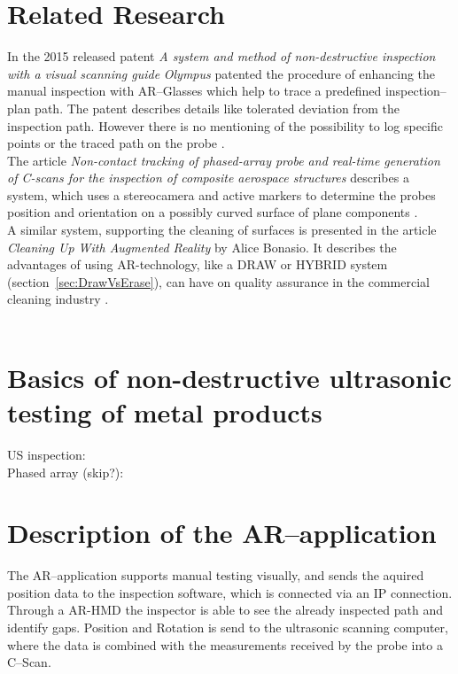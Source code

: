 \documentclass{VRARWorkshop}
\begin{document}
\section{Related Research}
In the 2015 released patent \textit{A system and method of non-destructive inspection with a visual scanning guide} \textit{Olympus} patented the procedure of enhancing the manual inspection with AR--Glasses which help to trace a predefined inspection--plan path.
The patent describes details like tolerated deviation from the inspection path.
However there is no mentioning of the possibility to log specific points or the traced path on the probe \cite{ARPat15}.\\

The article \textit{Non-contact tracking of phased-array probe and real-time generation of C-scans for the inspection of composite aerospace structures} describes a system, which uses a stereocamera and active markers to determine the probes position and orientation on a possibly curved surface of plane components \cite{walter_non-contact_2007}.\\

A similar system, supporting the cleaning of surfaces is presented in the article \textit{Cleaning Up With Augmented Reality} by Alice Bonasio.
It describes the advantages of using AR-technology, like a DRAW or HYBRID system (section~\ref{sec:DrawVsErase}), can have on quality assurance in the commercial cleaning industry \cite{ARClean}.\\

\cite{fadzil_design_2015}\\

\section{Basics of non-destructive ultrasonic testing of metal products}

US inspection:
\cite{deutsch_zfp_2010} \\
Phased array (skip?):
\cite{moles_introduction_2004}
\cite{olympus_Grundlagen}

\section{Description of the AR--application}
The AR--application supports manual testing visually, and sends the aquired position data to the inspection software, which is connected via an IP connection.
Through a AR-HMD the inspector is able to see the already inspected path and identify gaps.
Position and Rotation is send to the ultrasonic scanning computer, where the data is combined with the measurements received by the probe into a C--Scan.
\end{document}
